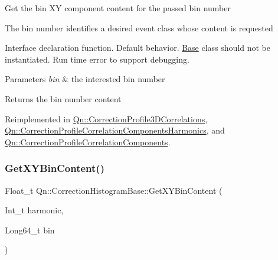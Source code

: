 Get the bin XY component content for the passed bin number

The bin number identifies a desired event class whose content is requested

Interface declaration function. Default behavior. \mbox{\hyperlink{classBase}{Base}} class should not be instantiated. Run time error to support debugging.


\begin{DoxyParams}{Parameters}
{\em bin} & the interested bin number \\
\hline
\end{DoxyParams}
\begin{DoxyReturn}{Returns}
the bin number content 
\end{DoxyReturn}


Reimplemented in \mbox{\hyperlink{classQn_1_1CorrectionProfile3DCorrelations_a47c118a0603a6ca87c505f940e35249c}{Qn\+::\+Correction\+Profile3\+D\+Correlations}}, \mbox{\hyperlink{classQn_1_1CorrectionProfileCorrelationComponentsHarmonics_a41d1dce57a2eab50abf2a02aaf7cce1e}{Qn\+::\+Correction\+Profile\+Correlation\+Components\+Harmonics}}, and \mbox{\hyperlink{classQn_1_1CorrectionProfileCorrelationComponents_ad690503e78ddf4017cd8813bb12e8583}{Qn\+::\+Correction\+Profile\+Correlation\+Components}}.

\mbox{\label{classQn_1_1CorrectionHistogramBase_a88e6cd702547df1b8ea0fcc371dc090d}} 
\subsubsection{\texorpdfstring{Get\+X\+Y\+Bin\+Content()}{GetXYBinContent()}\hspace{0.1cm}{\footnotesize\ttfamily [2/2]}}
{\footnotesize\ttfamily Float\+\_\+t Qn\+::\+Correction\+Histogram\+Base\+::\+Get\+X\+Y\+Bin\+Content (\begin{DoxyParamCaption}\item[{Int\+\_\+t}]{harmonic,  }\item[{Long64\+\_\+t}]{bin }\end{DoxyParamCaption})\hspace{0.3cm}{\ttfamily [virtual]}}

